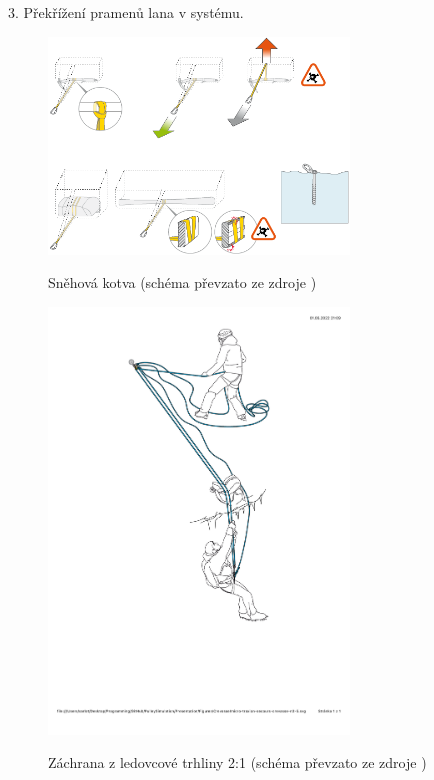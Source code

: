 3. Překřížení pramenů lana v systému.
\begin{figure}[h]
    \centering
    {\includegraphics[width=8.0cm]{Figures/Crevasse/Snow_anchor.png}}%
    \caption[Snehova_kotva]{Sněhová kotva (schéma převzato ze zdroje \cite{Petzl_2022})}
    \label{Obr:Snow_anchor}
\end{figure}
\begin{figure}[h]
    \centering
    {\includegraphics[width=8.0cm]{Figures/Crevasse/1_Petzl_Crevasse_haul_system_2_1.pdf}}%
    \caption[Crevasse 2:1]{Záchrana z ledovcové trhliny 2:1 (schéma převzato ze zdroje \cite{Petzl_2022})}
    \label{Obr:Crevasse_2:1}
\end{figure}
